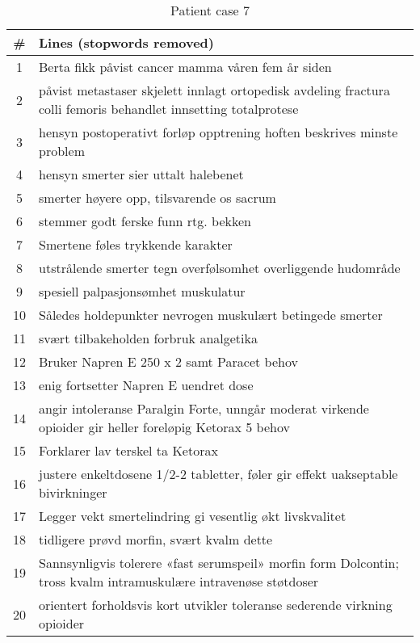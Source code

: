 \begin{table}[htbp] \footnotesize \center
\caption[]{Patient case 7\label{tab:case7}}
\begin{tabularx}{\textwidth}{c X}
    \toprule
    \# & Lines (stopwords removed) \\
    \midrule
    1 & Berta fikk påvist cancer mamma våren fem år siden \\
    2 & påvist metastaser skjelett innlagt ortopedisk avdeling fractura colli femoris behandlet innsetting totalprotese \\
    3 & hensyn postoperativt forløp opptrening hoften beskrives minste problem \\
    4 & hensyn smerter sier uttalt halebenet \\
    5 & smerter høyere opp, tilsvarende os sacrum \\
    6 & stemmer godt ferske funn rtg. bekken \\
    7 & Smertene føles trykkende karakter \\
    8 & utstrålende smerter tegn overfølsomhet overliggende hudområde \\
    9 & spesiell palpasjonsømhet muskulatur \\
    10 & Således holdepunkter nevrogen muskulært betingede smerter \\
    11 & svært tilbakeholden forbruk analgetika \\
    12 & Bruker Napren E 250 x 2 samt Paracet behov \\
    13 & enig fortsetter Napren E uendret dose \\
    14 & angir intoleranse Paralgin Forte, unngår moderat virkende opioider gir heller foreløpig Ketorax 5 behov \\
    15 & Forklarer lav terskel ta Ketorax \\
    16 & justere enkeltdosene 1/2-2 tabletter, føler gir effekt uakseptable bivirkninger \\
    17 & Legger vekt smertelindring gi vesentlig økt livskvalitet \\
    18 & tidligere prøvd morfin, svært kvalm dette \\
    19 & Sannsynligvis tolerere «fast serumspeil» morfin form Dolcontin; tross kvalm intramuskulære intravenøse støtdoser \\
    20 & orientert forholdsvis kort utvikler toleranse sederende virkning opioider \\
    \bottomrule
\end{tabularx}
\end{table}

